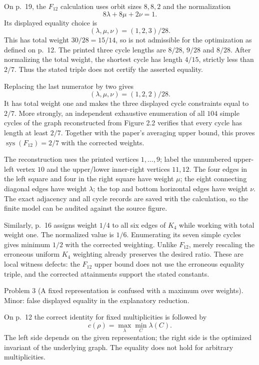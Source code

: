 \documentclass[10pt]{article}
\begin{document}
On p. 19, the \(F_{12}\) calculation uses orbit sizes \(8,8,2\) and the normalization \[8\lambda+8\mu+2\nu=1.\] Its displayed equality choice is \[(\lambda,\mu,\nu)=(1,2,3)/28.\] This has total weight \(30/28=15/14\), so is not admissible for the optimization as defined on p. 12. The printed three cycle lengths are \(8/28\), \(9/28\) and \(8/28\). After normalizing the total weight, the shortest cycle has length \(4/15\), strictly less than \(2/7\). Thus the stated triple does not certify the asserted equality.\par
Replacing the last numerator by two gives \[(\lambda,\mu,\nu)=(1,2,2)/28.\] It has total weight one and makes the three displayed cycle constraints equal to \(2/7\). More strongly, an independent exhaustive enumeration of all \(104\) simple cycles of the graph reconstructed from Figure 2.2 verifies that every cycle has length at least \(2/7\). Together with the paper’s averaging upper bound, this proves \(\operatorname{sys}(F_{12})=2/7\) with the corrected weights.\par
The reconstruction uses the printed vertices \(1,\ldots,9\); label the unnumbered upper-left vertex \(10\) and the upper/lower inner-right vertices \(11,12\). The four edges in the left square and four in the right square have weight \(\mu\); the eight connecting diagonal edges have weight \(\lambda\); the top and bottom horizontal edges have weight \(\nu\). The exact adjacency and all cycle records are saved with the calculation, so the finite model can be audited against the source figure.\par
Similarly, p. 16 assigns weight \(1/4\) to all six edges of \(K_4\) while working with total weight one. The normalized value is \(1/6\). Enumerating its seven simple cycles gives minimum \(1/2\) with the corrected weighting. Unlike \(F_{12}\), merely rescaling the erroneous uniform \(K_4\) weighting already preserves the desired ratio. These are local witness defects: the \(F_{12}\) upper bound does not use the erroneous equality triple, and the corrected attainments support the stated constants.\par
Problem 3 (A fixed representation is confused with a maximum over weights).  Minor: false displayed equality in the explanatory reduction.\par
On p. 12 the correct identity for fixed multiplicities is followed by \[c(\rho)=\max_\lambda\min_C\lambda(C).\] The left side depends on the given representation; the right side is the optimized invariant of the underlying graph. The equality does not hold for arbitrary multiplicities.\par
\end{document}
